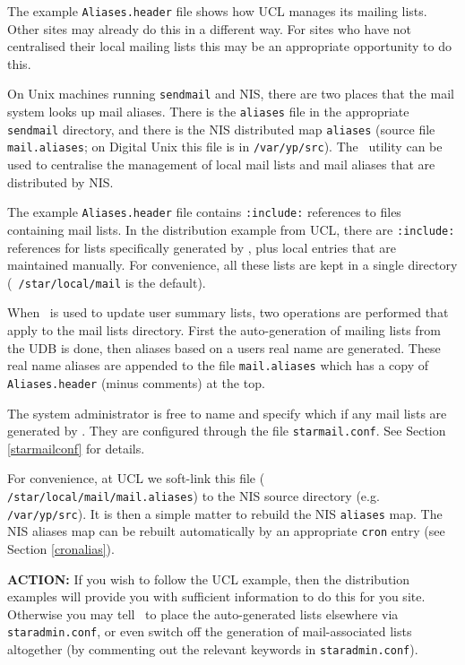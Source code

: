 The example {\tt Aliases.header} file shows how UCL manages its mailing
lists. Other sites may already do this in a different way. For sites who
have not centralised their local mailing lists this may be an appropriate
opportunity to do this.

On Unix machines running {\tt sendmail} and NIS, there are two places that
the mail system looks up mail aliases. There is the {\tt aliases} file in
the appropriate {\tt sendmail} directory, and there is the NIS distributed
map {\tt aliases} (source file {\tt mail.aliases}; on Digital Unix this
file is in {\tt /var/yp/src}). The \staradmin\ utility can be used to
centralise the management of local mail lists and mail aliases that are
distributed by NIS.

The example {\tt Aliases.header} file contains {\tt :include:} references
to files containing mail lists. In the distribution example from UCL,
there are {\tt :include:} references for lists specifically generated by
\staradmin, plus local entries that are maintained manually. For
convenience, all these lists are kept in a single directory ({\tt
/star/local/mail} is the default).

When \staradmin\ is used to update user summary lists, two operations are
performed that apply to the mail lists directory. First the
auto-generation of mailing lists from the UDB is done, then aliases based
on a users real name are generated. These real name aliases are appended
to the file {\tt mail.aliases} which has a copy of {\tt Aliases.header}
(minus comments) at the top.

The system administrator is free to name and specify which if any mail
lists are generated by \staradmin. They are configured through the file
{\tt starmail.conf}. See Section \ref{starmailconf} for details.

For convenience, at UCL we soft-link this file ({\tt
/star/local/mail/mail.aliases}) to the NIS source directory (e.g. {\tt
/var/yp/src}). It is then a simple matter to rebuild the NIS {\tt aliases}
map. The NIS aliases map can be rebuilt automatically by an appropriate
{\tt cron} entry (see Section \ref{cronalias}).

{\large\bf ACTION:} If you wish to follow the UCL example, then the
distribution examples will provide you with sufficient information to do
this for you site. Otherwise you may tell \staradmin\ to place the
auto-generated lists elsewhere via {\tt staradmin.conf}, or even switch
off the generation of mail-associated lists altogether (by commenting out
the relevant keywords in {\tt staradmin.conf}).

